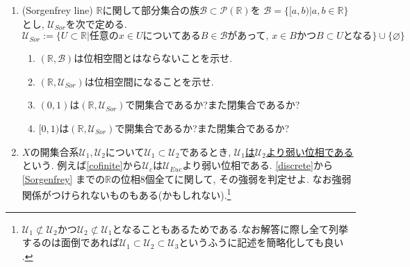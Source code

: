 \documentclass[dvipdfmx,a4paper,11pt]{article}
\newcommand{\R}{\mathbb{R}}
\newcommand{\N}{\mathbb{N}}
\theoremstyle{definition}
\begin{document}
\begin{enumerate}[label=\textbf{問}\ref*{sec-open}.\arabic*]
\item(Sorgenfrey line) \label{Sorgenfrey} $\R$に関して部分集合の族$\mathscr{B}\subset \mathcal{P}(\R)$を
$
\mathscr{B} = \{ [a, b) | a,b \in \R\}
$
とし, $\mathscr{U}_{Sor}$を次で定める. 
$$
\mathscr{U}_{Sor} := \{ U \subset \R | \text{任意の$x \in U$についてある$B \in \mathscr{B}$があって, $x \in B$かつ$B \subset U$となる}\} \cup \{  \varnothing \}
$$
	\begin{enumerate}	
	\setlength{\parskip}{0cm}
	\setlength{\itemsep}{0pt} 
	\item $(\R,\mathscr{B}  )$は位相空間とはならないことを示せ. 
	\item $(\R,\mathscr{U}_{Sor})$は位相空間になることを示せ.
	\item $(0,1)$は$(\R,\mathscr{U}_{Sor})$で開集合であるか?また閉集合であるか?
	\item $[0,1)$は$(\R,\mathscr{U}_{Sor})$で開集合であるか?また閉集合であるか?
	\end{enumerate}

\item $X$の開集合系$\mathscr{U}_1, \mathscr{U}_2$について$\mathscr{U}_1 \subset \mathscr{U}_2$であるとき, \underline{$\mathscr{U}_1$は$\mathscr{U}_2$より弱い位相である}という. 例えば\ref{cofinite}から$\mathscr{U}_c $は$\mathscr{U}_{Euc}$より弱い位相である.  
\ref{discrete}から\ref{Sorgenfrey} までの$\R$の位相8個全てに関して, その強弱を判定せよ. なお強弱関係がつけられないものもある(かもしれない).\footnote{$\mathscr{U}_1 \not \subset \mathscr{U}_2$かつ$\mathscr{U}_2 \not \subset\mathscr{U}_1$となることもあるためである.なお解答に際し全て列挙するのは面倒であれば$\mathscr{U}_1 \subset \mathscr{U}_2 \subset \mathscr{U}_3$というふうに記述を簡略化しても良い .} 





\end{enumerate}
\end{document}
